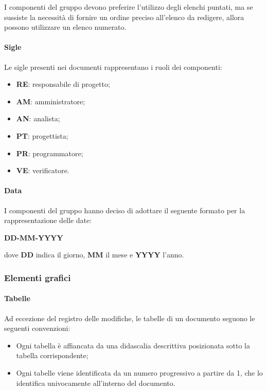 I componenti del gruppo devono preferire l'utilizzo degli elenchi puntati, ma se sussiste la necessità di fornire un ordine preciso all'elenco da redigere, allora possono utilizzare un elenco numerato.

\paragraph{Sigle}
Le sigle presenti nei documenti rappresentano i ruoli dei componenti:
\begin{itemize}

	\item \textbf{RE}: responsabile di progetto;
	
	\item \textbf{AM}: amministratore;
	
	\item \textbf{AN}: analista;
	
	\item \textbf{PT}: progettista;
	
	\item \textbf{PR}: programmatore;
	
	\item \textbf{VE}: verificatore.

\end{itemize}

\paragraph{Data}
I componenti del gruppo hanno deciso di adottare il seguente formato per la rappresentazione delle date:
\begin{center}
\textbf{DD-MM-YYYY}
\end{center}
dove \textbf{DD} indica il giorno, \textbf{MM} il mese e \textbf{YYYY} l'anno.

\subsubsection{Elementi grafici}
\paragraph{Tabelle}
Ad eccezione del registro delle modifiche, le tabelle di un documento seguono le seguenti convenzioni:
\begin{itemize}

	\item Ogni tabella è affiancata da una didascalia descrittiva posizionata sotto la tabella corrispondente;
	
	\item Ogni tabelle viene identificata da un numero progressivo a partire da 1, che lo identifica univocamente all'interno del documento.

\end{itemize}
